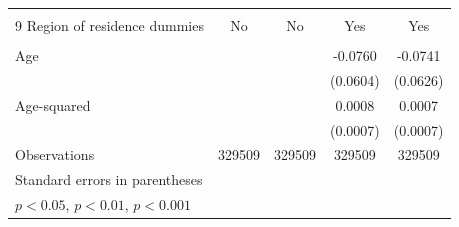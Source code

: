 \documentclass[a4paper]{article}
\begin{document}
\begin{landscape}
\begin{table}[htbp]
\begin{tabular}{l*{4}{c}}
                         &                     &                     &                                   &           \\                       
[1em]
9 Region of residence dummies     &          No           &      No               &                                               Yes&       Yes\\
                         &                     &                     &                                    &          \\   
Age                      &                     &                     &          -0.0760         &     -0.0741         \\
                                 &                     &                     &    (0.0604)         &    (0.0626)         \\
[1em]
Age-squared              &                     &                     &                           0.0008         &    0.0007         \\
                                &                     &                     &  (0.0007)         &  (0.0007)         \\
\hline
Observations             &      329509         &      329509         &      329509         &      329509         &               \\
\hline\hline
\multicolumn{9}{l}{\footnotesize Standard errors in parentheses}\\
\multicolumn{9}{l}{\footnotesize \sym{*} \(p<0.05\), \sym{**} \(p<0.01\), \sym{***} \(p<0.001\)}\\
\end{tabular}
\end{table}
\end{landscape}
\item
\item
\item
\end{document}
